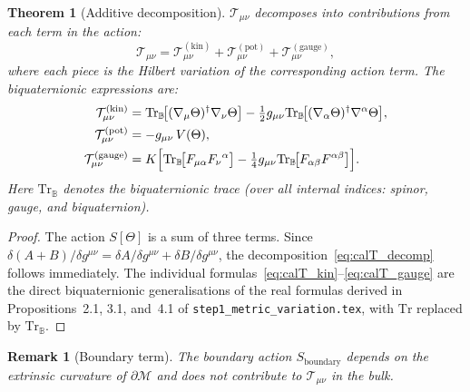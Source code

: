 \documentclass[12pt]{article}
\newtheorem{theorem}[definition]{Theorem}
\newtheorem{remark}[definition]{Remark}
\newcommand{\Tr}{\mathrm{Tr}}
\begin{document}
\begin{theorem}[Additive decomposition]
\label{thm:decomp}
$\mathcal{T}_{\mu\nu}$ decomposes into contributions from each term in
the action:
\begin{equation}
  \label{eq:calT_decomp}
  \mathcal{T}_{\mu\nu}
  = \mathcal{T}^{(\mathrm{kin})}_{\mu\nu}
  + \mathcal{T}^{(\mathrm{pot})}_{\mu\nu}
  + \mathcal{T}^{(\mathrm{gauge})}_{\mu\nu},
\end{equation}
where each piece is the Hilbert variation of the corresponding action term.
The biquaternionic expressions are:
\begin{align}
  \mathcal{T}^{(\mathrm{kin})}_{\mu\nu}
    &= \Tr_{\mathbb{B}}\!\bigl[(\nabla_\mu\Theta)^\dagger\nabla_\nu\Theta\bigr]
       -\tfrac{1}{2}g_{\mu\nu}
       \Tr_{\mathbb{B}}\!\bigl[(\nabla_\alpha\Theta)^\dagger\nabla^\alpha\Theta\bigr],
       \label{eq:calT_kin} \\
  \mathcal{T}^{(\mathrm{pot})}_{\mu\nu}
    &= -g_{\mu\nu}\,V(\Theta),
       \label{eq:calT_pot} \\
  \mathcal{T}^{(\mathrm{gauge})}_{\mu\nu}
    &= K\Bigl[
         \Tr_{\mathbb{B}}\!\bigl[F_{\mu\alpha}F_\nu{}^\alpha\bigr]
         -\tfrac{1}{4}g_{\mu\nu}
         \Tr_{\mathbb{B}}\!\bigl[F_{\alpha\beta}F^{\alpha\beta}\bigr]
       \Bigr].
       \label{eq:calT_gauge}
\end{align}
Here $\Tr_{\mathbb{B}}$ denotes the biquaternionic trace (over all internal
indices: spinor, gauge, and biquaternion).
\end{theorem}

\begin{proof}
  The action $S[\Theta]$ is a sum of three terms.  Since
  $\delta(A+B)/\delta g^{\mu\nu} = \delta A/\delta g^{\mu\nu}
  + \delta B/\delta g^{\mu\nu}$, the decomposition~\eqref{eq:calT_decomp}
  follows immediately.  The individual formulas~\eqref{eq:calT_kin}--\eqref{eq:calT_gauge}
  are the direct biquaternionic generalisations of the real formulas
  derived in Propositions~2.1, 3.1, and~4.1 of
  \texttt{step1\_metric\_variation.tex}, with $\Tr$ replaced by
  $\Tr_{\mathbb{B}}$.
\end{proof}

\begin{remark}[Boundary term]
  The boundary action $S_{\mathrm{boundary}}$ depends on the extrinsic curvature
  of $\partial\mathcal{M}$ and does not contribute to $\mathcal{T}_{\mu\nu}$
  in the bulk.
\end{remark}

\end{document}
